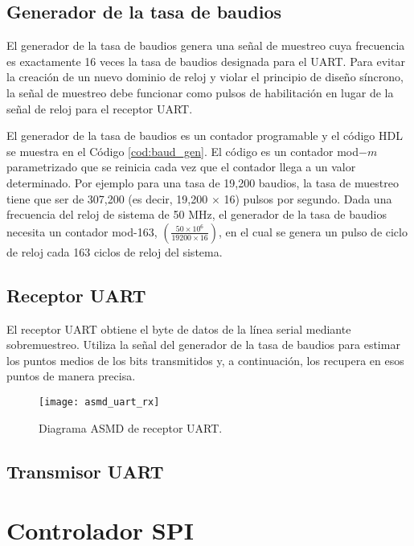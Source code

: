     \subsection{Generador de la tasa de baudios}

    El generador de la tasa de baudios genera una señal de muestreo cuya frecuencia es exactamente 16 veces la tasa de baudios designada para el UART. Para evitar la creación de un nuevo dominio de reloj y violar el principio de diseño síncrono, la señal de muestreo debe funcionar como pulsos de habilitación en lugar de la señal de reloj para el receptor UART.

    El generador de la tasa de baudios es un contador programable y el código HDL se muestra en el Código \ref{cod:baud_gen}. El código es un contador mod$-m$ parametrizado que se reinicia cada vez que el contador llega a un valor determinado. Por ejemplo para una tasa de 19,200 baudios, la tasa de muestreo tiene que ser de 307,200 (es decir, 19,200 $\times$ 16) pulsos por segundo. Dada una frecuencia del reloj de sistema de 50 MHz, el generador de la tasa de baudios necesita un contador mod-163, $\left( \frac{50 \times 10^{6}}{19200 \times 16} \right)$, en el cual se genera un pulso de ciclo de reloj cada 163 ciclos de reloj del sistema.

    \subsection{Receptor UART}

    El receptor UART obtiene el byte de datos de la línea serial mediante sobremuestreo. Utiliza la señal del generador de la tasa de baudios para estimar los puntos medios de los bits transmitidos y, a continuación, los recupera en esos puntos de manera precisa.

    \begin{figure}[hbtp]
      \centering
      \texttt{[image: asmd\_uart\_rx]}
      \caption{Diagrama ASMD de receptor UART.}
      \label{fig:asmd_uart_rx}
    \end{figure}

    \subsection{Transmisor UART}

	\section{Controlador SPI}

